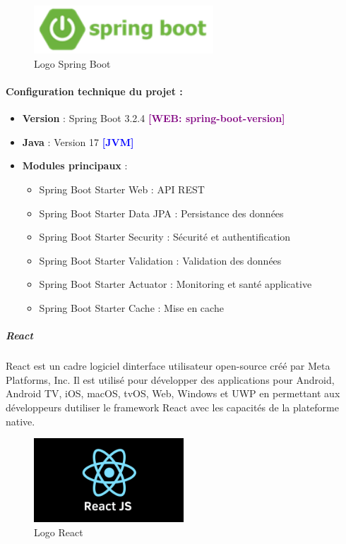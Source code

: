\documentclass[12pt,a4paper,twoside,openright]{report}
\newcommand{\toabbrev}[1]{\textcolor{blue}{\textbf{[#1]}}}
\newcommand{\webref}[1]{\textcolor{purple}{\textbf{[WEB: #1]}}}
\begin{document}
\begin{figure}[H]
\centering
\includegraphics[width=0.6\textwidth]{latex_media/media/image23.png}
\caption{Logo Spring Boot}
\label{fig:logo-spring-boot}
\end{figure}

\hypertarget{configuration-technique-du-projet}{%
\paragraph{Configuration technique du projet
:}\label{configuration-technique-du-projet}}

\begin{itemize}
\item
  \textbf{Version} : Spring Boot 3.2.4 \webref{spring-boot-version}
\item
  \textbf{Java} : Version 17 \toabbrev{JVM}
\item
  \textbf{Modules principaux} :

  \begin{itemize}
  \item
    Spring Boot Starter Web : API REST
  \item
    Spring Boot Starter Data JPA : Persistance des données
  \item
    Spring Boot Starter Security : Sécurité et authentification
  \item
    Spring Boot Starter Validation : Validation des données
  \item
    Spring Boot Starter Actuator : Monitoring et santé applicative
  \item
    Spring Boot Starter Cache : Mise en cache
  \end{itemize}
\end{itemize}

\hypertarget{react}{%
\subparagraph{React}\label{react}}

React est un cadre logiciel d\textquotesingle interface utilisateur
open-source créé par Meta Platforms, Inc. Il est utilisé pour développer
des applications pour Android, Android TV, iOS, macOS, tvOS, Web,
Windows et UWP en permettant aux développeurs d\textquotesingle utiliser
le framework React avec les capacités de la plateforme native.

\begin{figure}[H]
\centering
\includegraphics[width=0.5\textwidth]{latex_media/media/image24.png}
\caption{Logo React}
\label{fig:logo-react}
\end{figure}
\end{document}

